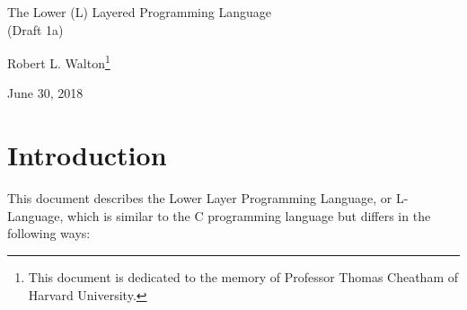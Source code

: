 \documentclass[12pt]{article}
\makeatletter
\renewcommand\tableofcontents{%
    \begin{list}{}%
	     {\setlength{\itemsep}{0in}%
	      \setlength{\topsep}{0in}%
	      \setlength{\parsep}{1ex}%
	      \setlength{\labelwidth}{0in}%
	      \setlength{\baselineskip}{1.5ex}%
	      \setlength{\leftmargin}{1.0in}%
	      \setlength{\rightmargin}{1.0in}}%
    \item\@starttoc{toc}%
    \end{list}}
\makeatother
\begin{document}
        
\begin{center}

{\Large
The Lower (L) Layered Programming Language \\[0.5ex]
(Draft 1a)}

\medskip

Robert L. Walton\footnote{This document is dedicated to the memory
of Professor Thomas Cheatham of Harvard University.}

June 30, 2018
 
\end{center}

{\small \tableofcontents}

\newpage

\section{Introduction}

This document describes the Lower Layer Programming Language, or
L-Language, which is similar to the C programming language
but differs in the following ways:
\end{document}
